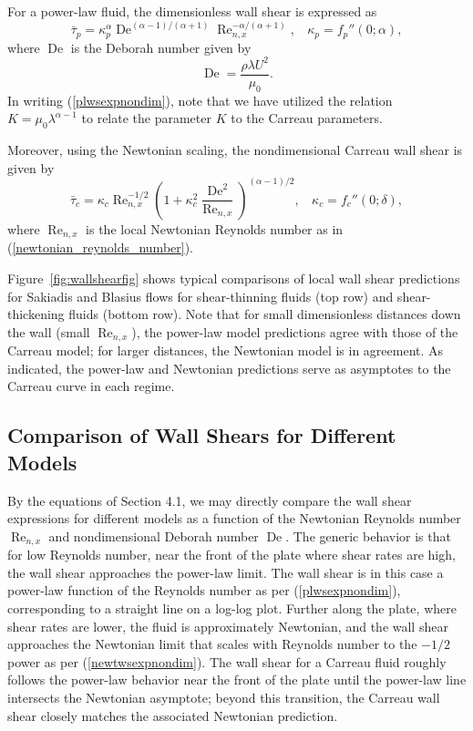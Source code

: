 \documentclass{article}
\begin{document}
For a power-law fluid, the dimensionless wall shear is expressed as \begin{equation}
    \bar{\tau}_p = \kappa_p^\alpha \operatorname{De}^{(\alpha-1)/(\alpha+1)} \operatorname{Re}_{n, x}^{-\alpha/(\alpha+1)}, ~~~~ \kappa_p = f_p''(0; \alpha),  \label{plwsexpnondim}
\end{equation} where $\operatorname{De}$ is the Deborah number given by \begin{equation}
    \operatorname{De} = \frac{\rho \lambda U^2}{\mu_0}.
\end{equation} In writing (\ref{plwsexpnondim}), note that we have utilized the relation $K=\mu_0 \lambda^{\alpha-1}$ to relate the parameter $K$ to the Carreau parameters.

Moreover, using the Newtonian scaling, the nondimensional Carreau wall shear is given by \begin{equation} \bar{\tau}_{c} = \kappa_{c} \operatorname{Re}_{n, x}^{-1/2} \left( 1 +  \kappa_c^2 \frac{\operatorname{De}^2}{\operatorname{Re}_{n, x}} \right)^{(\alpha-1)/2}, ~~~~ \kappa_c=f_c''(0; \delta), \label{carwsexpnondim}\end{equation} where $\operatorname{Re}_{n,x}$ is the local Newtonian Reynolds number as in (\ref{newtonian_reynolds_number}).

Figure~\ref{fig:wallshearfig} shows typical comparisons of local wall shear predictions for Sakiadis and Blasius flows for shear-thinning fluids (top row) and shear-thickening fluids (bottom row).  Note that for small dimensionless distances down the wall (small $\operatorname{Re}_{n, x}$), the power-law model predictions agree with those of the Carreau model; for larger distances, the Newtonian model is in agreement.  As indicated, the power-law and Newtonian predictions serve as asymptotes to the Carreau curve in each regime.

\subsection{Comparison of Wall Shears for Different Models}

By the equations of Section 4.1, we may directly compare the wall shear expressions for different models as a function of the Newtonian Reynolds number $\operatorname{Re}_{n, x}$ and nondimensional Deborah number $\operatorname{De}$. The generic behavior is that for low Reynolds number, near the front of the plate where shear rates are high, the wall shear approaches the power-law limit. The wall shear is in this case a power-law function of the Reynolds number as per (\ref{plwsexpnondim}), corresponding to a straight line on a log-log plot. Further along the plate, where shear rates are lower, the fluid is approximately Newtonian, and the wall shear approaches the Newtonian limit that scales with Reynolds number to the $-1/2$ power as per (\ref{newtwsexpnondim}). The wall shear for a Carreau fluid roughly follows the power-law behavior near the front of the plate until the power-law line intersects the Newtonian asymptote; beyond this transition, the Carreau wall shear closely matches the associated Newtonian prediction.
\end{document}
